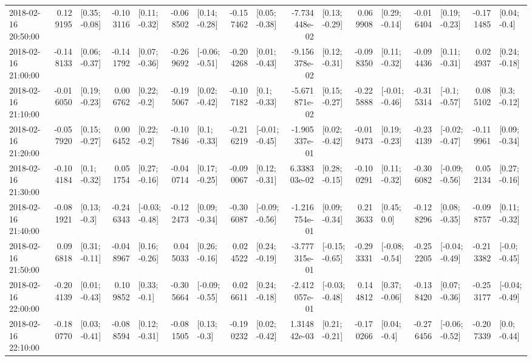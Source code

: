 \begin{tabular}{lrlrlrlrlrlrlrlrl}
2018-02-16 20:50:00 &  0.129195 &   [0.35; -0.08] & -0.103116 &   [0.11; -0.32] & -0.068502 &   [0.14; -0.28] & -0.157462 &   [0.05; -0.38] & -7.734448e-02 &   [0.13; -0.29] &  0.069908 &   [0.29; -0.14] & -0.016404 &   [0.19; -0.23] & -0.171485 &    [0.04; -0.4] \\
2018-02-16 21:00:00 & -0.148133 &   [0.06; -0.37] & -0.141792 &   [0.07; -0.36] & -0.269692 &  [-0.06; -0.51] & -0.204268 &   [0.01; -0.43] & -9.156378e-02 &   [0.12; -0.31] & -0.098350 &   [0.11; -0.32] & -0.094436 &   [0.11; -0.31] &  0.024937 &   [0.24; -0.18] \\
2018-02-16 21:10:00 & -0.016050 &   [0.19; -0.23] &  0.006762 &    [0.22; -0.2] & -0.195067 &   [0.02; -0.42] & -0.107182 &    [0.1; -0.33] & -5.671871e-02 &   [0.15; -0.27] & -0.225888 &  [-0.01; -0.46] & -0.315314 &   [-0.1; -0.57] &  0.085102 &    [0.3; -0.12] \\
2018-02-16 21:20:00 & -0.057920 &   [0.15; -0.27] &  0.006452 &    [0.22; -0.2] & -0.107846 &    [0.1; -0.33] & -0.216219 &  [-0.01; -0.45] & -1.905337e-01 &   [0.02; -0.42] & -0.019473 &   [0.19; -0.23] & -0.234139 &  [-0.02; -0.47] & -0.119961 &   [0.09; -0.34] \\
2018-02-16 21:30:00 & -0.104184 &    [0.1; -0.32] &  0.051754 &   [0.27; -0.16] & -0.040714 &   [0.17; -0.25] & -0.090067 &   [0.12; -0.31] &  6.338303e-02 &   [0.28; -0.15] & -0.100291 &   [0.11; -0.32] & -0.306082 &  [-0.09; -0.56] &  0.052134 &   [0.27; -0.16] \\
2018-02-16 21:40:00 & -0.081921 &    [0.13; -0.3] & -0.246343 &  [-0.03; -0.48] & -0.122473 &   [0.09; -0.34] & -0.306087 &  [-0.09; -0.56] & -1.216754e-01 &   [0.09; -0.34] &  0.213633 &     [0.45; 0.0] & -0.128296 &   [0.08; -0.35] & -0.098757 &   [0.11; -0.32] \\
2018-02-16 21:50:00 &  0.096818 &   [0.31; -0.11] & -0.048967 &   [0.16; -0.26] &  0.045033 &   [0.26; -0.16] &  0.024522 &   [0.24; -0.19] & -3.777315e-01 &  [-0.15; -0.65] & -0.293331 &  [-0.08; -0.54] & -0.252205 &  [-0.04; -0.49] & -0.213382 &   [-0.0; -0.45] \\
2018-02-16 22:00:00 & -0.204139 &   [0.01; -0.43] &  0.109852 &    [0.33; -0.1] & -0.305664 &  [-0.09; -0.55] &  0.026611 &   [0.24; -0.18] & -2.412057e-01 &  [-0.03; -0.48] &  0.144812 &   [0.37; -0.06] & -0.138420 &   [0.07; -0.36] & -0.253177 &  [-0.04; -0.49] \\
2018-02-16 22:10:00 & -0.180770 &   [0.03; -0.41] & -0.088594 &   [0.12; -0.31] & -0.081505 &    [0.13; -0.3] & -0.190232 &   [0.02; -0.42] &  1.314842e-03 &   [0.21; -0.21] & -0.170266 &    [0.04; -0.4] & -0.276456 &  [-0.06; -0.52] & -0.207339 &    [0.0; -0.44] \\

\end{tabular}
